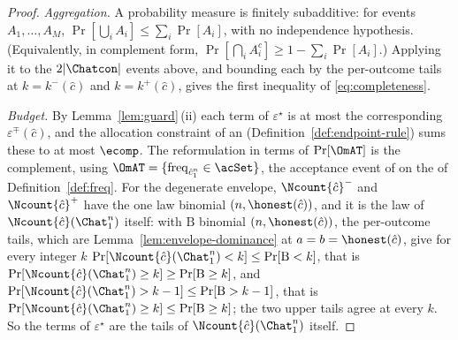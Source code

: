 \begin{proof}
\emph{Aggregation.} A probability measure is finitely subadditive: for events
$A_1,\dots,A_M$, $\Pr[\bigcup_{i}A_i]\le\sum_{i}\Pr[A_i]$, with no
independence hypothesis. (Equivalently, in complement form,
$\Pr[\bigcap_i A_i^{c}]\ge1-\sum_i\Pr[A_i]$.) Applying it to the $2|\Chatcon|$
events above, and bounding each by the per-outcome tails at
$k=k^{-}(\hat c)$ and $k=k^{+}(\hat c)$, gives the first inequality of
\eqref{eq:completeness}.

\emph{Budget.} By Lemma~\ref{lem:guard}\,(ii) each term of
$\varepsilon^{\star}$ is at most the corresponding $\varepsilon^{\mp}(\hat c)$,
and the allocation constraint of an 
(Definition~\ref{def:endpoint-rule}) sums these to at most $\ecomp$. The
reformulation in terms of $\Pr[\OmAT]$ is the complement, using
$\OmAT=\{\operatorname{freq}_{\hat c_1^n}\in\acSet\}$, the acceptance event
of  on the  of
Definition~\ref{def:freq}. For the degenerate envelope,
$\Ncount{\hat c}^{-}$ and $\Ncount{\hat c}^{+}$ have the one law binomial
$(n,\honest(\hat c))$, and it is the law of $\Ncount{\hat c}(\Chat_1^n)$
itself: with $\mathrm{B}$ binomial $(n,\honest(\hat c))$, the per-outcome
tails, which are Lemma~\ref{lem:envelope-dominance} at
$a=b=\honest(\hat c)$, give for every integer $k$
$\Pr[\Ncount{\hat c}(\Chat_1^n)<k]\le\Pr[\mathrm{B}<k]$, that is
$\Pr[\Ncount{\hat c}(\Chat_1^n)\ge k]\ge\Pr[\mathrm{B}\ge k]$, and
$\Pr[\Ncount{\hat c}(\Chat_1^n)>k-1]\le\Pr[\mathrm{B}>k-1]$, that is
$\Pr[\Ncount{\hat c}(\Chat_1^n)\ge k]\le\Pr[\mathrm{B}\ge k]$; the two
upper tails agree at every $k$. So the terms of $\varepsilon^{\star}$ are
the tails of $\Ncount{\hat c}(\Chat_1^n)$ itself.
\end{proof}
